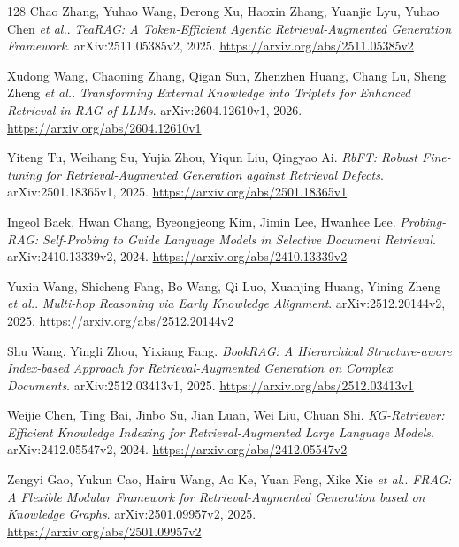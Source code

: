 \documentclass[11pt,a4paper]{article}
\begin{document}
\begin{thebibliography}{128}
Chao Zhang, Yuhao Wang, Derong Xu, Haoxin Zhang, Yuanjie Lyu, Yuhao Chen \emph{et al.}.
\newblock \emph{TeaRAG: A Token-Efficient Agentic Retrieval-Augmented Generation Framework}.
\newblock arXiv:2511.05385v2, 2025.
\newblock \url{https://arxiv.org/abs/2511.05385v2}

Xudong Wang, Chaoning Zhang, Qigan Sun, Zhenzhen Huang, Chang Lu, Sheng Zheng \emph{et al.}.
\newblock \emph{Transforming External Knowledge into Triplets for Enhanced Retrieval in RAG of LLMs}.
\newblock arXiv:2604.12610v1, 2026.
\newblock \url{https://arxiv.org/abs/2604.12610v1}

Yiteng Tu, Weihang Su, Yujia Zhou, Yiqun Liu, Qingyao Ai.
\newblock \emph{RbFT: Robust Fine-tuning for Retrieval-Augmented Generation against Retrieval Defects}.
\newblock arXiv:2501.18365v1, 2025.
\newblock \url{https://arxiv.org/abs/2501.18365v1}

Ingeol Baek, Hwan Chang, Byeongjeong Kim, Jimin Lee, Hwanhee Lee.
\newblock \emph{Probing-RAG: Self-Probing to Guide Language Models in Selective Document Retrieval}.
\newblock arXiv:2410.13339v2, 2024.
\newblock \url{https://arxiv.org/abs/2410.13339v2}

Yuxin Wang, Shicheng Fang, Bo Wang, Qi Luo, Xuanjing Huang, Yining Zheng \emph{et al.}.
\newblock \emph{Multi-hop Reasoning via Early Knowledge Alignment}.
\newblock arXiv:2512.20144v2, 2025.
\newblock \url{https://arxiv.org/abs/2512.20144v2}

Shu Wang, Yingli Zhou, Yixiang Fang.
\newblock \emph{BookRAG: A Hierarchical Structure-aware Index-based Approach for Retrieval-Augmented Generation on Complex Documents}.
\newblock arXiv:2512.03413v1, 2025.
\newblock \url{https://arxiv.org/abs/2512.03413v1}

Weijie Chen, Ting Bai, Jinbo Su, Jian Luan, Wei Liu, Chuan Shi.
\newblock \emph{KG-Retriever: Efficient Knowledge Indexing for Retrieval-Augmented Large Language Models}.
\newblock arXiv:2412.05547v2, 2024.
\newblock \url{https://arxiv.org/abs/2412.05547v2}

Zengyi Gao, Yukun Cao, Hairu Wang, Ao Ke, Yuan Feng, Xike Xie \emph{et al.}.
\newblock \emph{FRAG: A Flexible Modular Framework for Retrieval-Augmented Generation based on Knowledge Graphs}.
\newblock arXiv:2501.09957v2, 2025.
\newblock \url{https://arxiv.org/abs/2501.09957v2}


\end{thebibliography}
\end{document}
